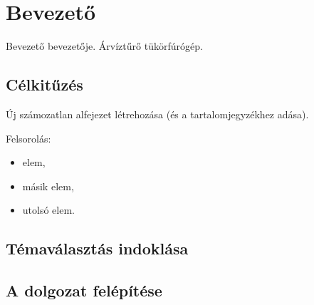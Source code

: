 \chapter{Bevezető}
Bevezető bevezetője. Árvíztűrő tükörfúrógép.

\section*{Célkitűzés}
Új számozatlan alfejezet létrehozása (és a tartalomjegyzékhez adása). 

Felsorolás:
\begin{itemize}
  \item elem,
  \item másik elem,
  \item utolsó elem.
\end{itemize}

\section*{Témaválasztás indoklása}

\section*{A dolgozat felépítése}
